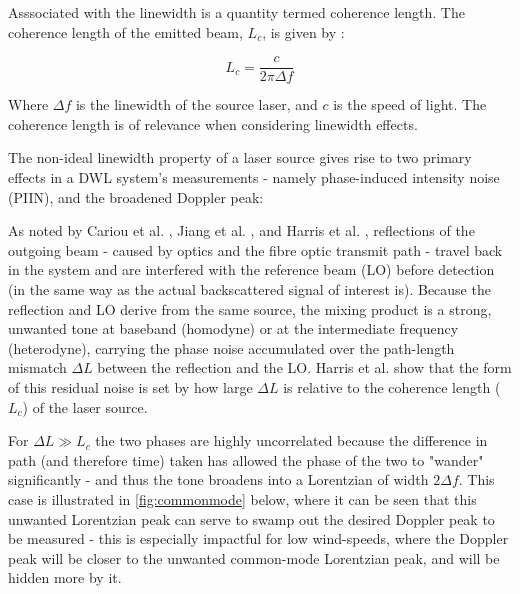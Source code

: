     Asssociated with the linewidth is a quantity termed coherence length. The coherence length of the emitted beam, $L_c$, is given by \cite{bennett_doppler_2003}:

    \begin{equation}
        L_c = \frac{c}{2\pi\Delta f}
        \label{eqn:coherenceLength}
    \end{equation}

    Where $\Delta f$ is the linewidth of the source laser, and $c$ is the speed of light. The coherence length is of relevance when considering linewidth effects.

    The non-ideal linewidth property of a laser source gives rise to two primary effects in a DWL system's measurements - namely phase-induced intensity noise (PIIN), and the broadened Doppler peak:

    As noted by Cariou et al. \cite{cariou2006laser}, Jiang et al. \cite{jiang_performance_2019}, and Harris et al. \cite{harris_role_1998}, reflections of the outgoing beam - caused by optics and the fibre optic transmit path - travel back in the system and are interfered with the reference beam (LO) before detection (in the same way as the actual backscattered signal of interest is). Because the reflection and LO derive
    from the same source, the mixing product is a strong, unwanted tone at baseband (homodyne)
    or at the intermediate frequency (heterodyne), carrying the phase noise
    accumulated over the path-length mismatch $\Delta L$ between the reflection and the LO. Harris et
    al. \cite{harris_role_1998} show that the form of this residual noise is set by how large
    $\Delta L$ is relative to the coherence length ($L_c$) of the laser source.

    For $\Delta L \gg L_c$ the two
    phases are highly uncorrelated because the difference in path (and therefore time) taken has allowed the phase of the two to "wander" significantly - and thus the tone broadens into a Lorentzian of width
    $2\Delta f$. This case is illustrated in \autoref{fig:commonmode} below, where it can be seen that this unwanted Lorentzian peak can serve to swamp out the desired Doppler peak to be measured - this is especially impactful for low wind-speeds, where the Doppler peak will be closer to the unwanted common-mode Lorentzian peak, and will be hidden more by it.

